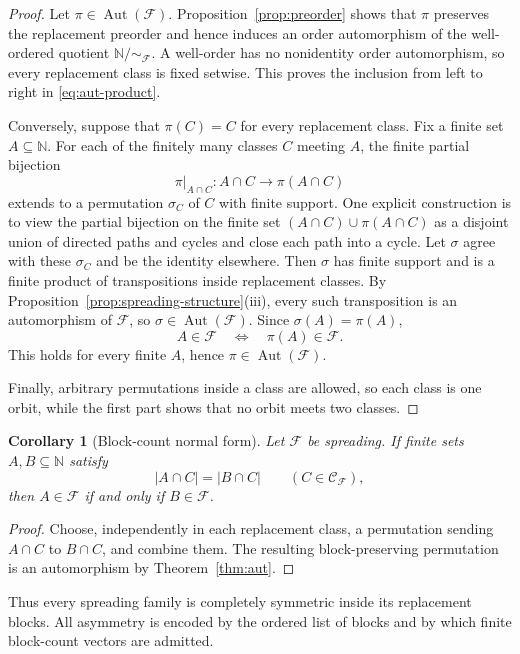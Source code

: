 \documentclass[11pt]{article}
\newtheorem{corollary}[theorem]{Corollary}
\theoremstyle{definition}
\theoremstyle{remark}
\newcommand{\N}{\mathbb N}
\newcommand{\F}{\mathcal F}
\newcommand{\Ccal}{\mathcal C}
\newcommand{\Aut}{\operatorname{Aut}}
\begin{document}
\begin{proof}
Let $\pi\in\Aut(\F)$.  Proposition~\ref{prop:preorder} shows that $\pi$
preserves the replacement preorder and hence induces an order automorphism
of the well-ordered quotient $\N/{\sim_{\F}}$.  A well-order has no
nonidentity order automorphism, so every replacement class is fixed setwise.
This proves the inclusion from left to right in \eqref{eq:aut-product}.

Conversely, suppose that $\pi(C)=C$ for every replacement class.  Fix a finite
set $A\subseteq\N$.  For each of the finitely many classes $C$ meeting $A$,
the finite partial bijection
\[
  \pi\big|_{A\cap C}:A\cap C\longrightarrow \pi(A\cap C)
\]
extends to a permutation $\sigma_C$ of $C$ with finite support.  One explicit
construction is to view the partial bijection on the finite set
$(A\cap C)\cup\pi(A\cap C)$ as a disjoint union of directed paths and cycles
and close each path into a cycle.  Let $\sigma$ agree with these $\sigma_C$
and be the identity elsewhere.  Then $\sigma$ has finite support and is a
finite product of transpositions inside replacement classes.  By
Proposition~\ref{prop:spreading-structure}(iii), every such transposition is
an automorphism of $\F$, so $\sigma\in\Aut(\F)$.  Since
$\sigma(A)=\pi(A)$,
\[
  A\in\F\quad\Longleftrightarrow\quad\pi(A)\in\F.
\]
This holds for every finite $A$, hence $\pi\in\Aut(\F)$.

Finally, arbitrary permutations inside a class are allowed, so each class is
one orbit, while the first part shows that no orbit meets two classes.
\end{proof}

\begin{corollary}[Block-count normal form]\label{cor:block-count}
Let $\F$ be spreading.  If finite sets $A,B\subseteq\N$ satisfy
\[
  |A\cap C|=|B\cap C|\qquad(C\in\Ccal_{\F}),
\]
then $A\in\F$ if and only if $B\in\F$.
\end{corollary}

\begin{proof}
Choose, independently in each replacement class, a permutation sending
$A\cap C$ to $B\cap C$, and combine them.  The resulting block-preserving
permutation is an automorphism by Theorem~\ref{thm:aut}.
\end{proof}

Thus every spreading family is completely symmetric inside its replacement
blocks.  All asymmetry is encoded by the ordered list of blocks and by which
finite block-count vectors are admitted.
\end{document}
